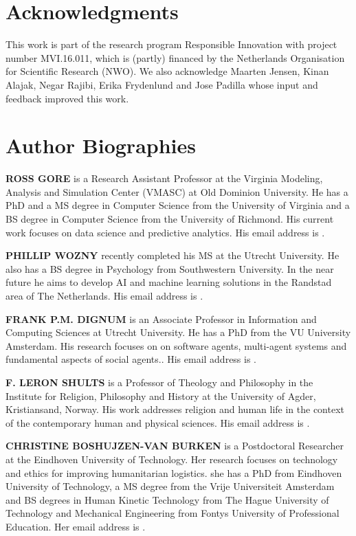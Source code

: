 \documentclass{scspaperproc}
\theoremstyle{scsthe}
\begin{document}
\section*{Acknowledgments}
This work is part of the research program Responsible Innovation with project number MVI.16.011, which is (partly) financed by the Netherlands Organisation for Scientific Research (NWO). We also acknowledge Maarten Jensen, Kinan Alajak, Negar Rajibi, Erika Frydenlund and Jose Padilla whose input and feedback improved this work.



\section*{Author Biographies}

\textbf{\uppercase{ROSS GORE}} is a Research Assistant Professor at the Virginia Modeling, Analysis and Simulation Center (VMASC) at Old Dominion University. He has a PhD and a MS degree in Computer Science from the University of Virginia and a BS degree in Computer Science from the University of Richmond. His current work focuses on data science and predictive analytics. His email address is .

\textbf{\uppercase{PHILLIP WOZNY}} recently completed his MS at the Utrecht University. He also has a BS degree in Psychology from Southwestern University. In the near future he aims to develop AI and machine learning solutions in the Randstad area of The Netherlands. His email address is .

\textbf{\uppercase{FRANK P.M. DIGNUM}} is an Associate Professor in Information and Computing Sciences at Utrecht University. He has a PhD from the VU University Amsterdam. His research focuses on on software agents, multi-agent systems and fundamental aspects of social agents.. His email address is .

\textbf{\uppercase{F. LERON SHULTS}} is a Professor of Theology and Philosophy in the Institute for Religion, Philosophy and History at the University of Agder, Kristiansand, Norway. His work addresses religion and human life in the context of the contemporary human and physical sciences. His email address is .

\textbf{\uppercase{CHRISTINE BOSHUJZEN-VAN BURKEN}} is a Postdoctoral Researcher at the Eindhoven University of Technology. Her research focuses on technology and ethics for improving humanitarian logistics. she has a PhD from Eindhoven University of Technology, a MS degree from the Vrije Universiteit Amsterdam and BS degrees in Human Kinetic Technology from The Hague University of Technology and Mechanical Engineering from Fontys University of Professional Education. Her email address is .
\end{document}
